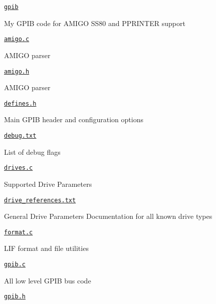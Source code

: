 \begin{DoxyItemize}
\item \href{gpib/gpib}{\tt gpib}
\begin{DoxyItemize}
\item My G\+P\+IB code for A\+M\+I\+GO S\+S80 and P\+P\+R\+I\+N\+T\+ER support
\item \href{gpib/amigo.c}{\tt amigo.\+c}
\begin{DoxyItemize}
\item A\+M\+I\+GO parser
\end{DoxyItemize}
\item \href{gpib/amigo.h}{\tt amigo.\+h}
\begin{DoxyItemize}
\item A\+M\+I\+GO parser
\end{DoxyItemize}
\item \href{gpib/defines.h}{\tt defines.\+h}
\begin{DoxyItemize}
\item Main G\+P\+IB header and configuration options
\end{DoxyItemize}
\item \href{debug.txt}{\tt debug.\+txt}
\begin{DoxyItemize}
\item List of debug flags
\end{DoxyItemize}
\item \href{gpib/drives.c}{\tt drives.\+c}
\begin{DoxyItemize}
\item Supported Drive Parameters
\end{DoxyItemize}
\item \href{gpib/drive_references.txt}{\tt drive\+\_\+references.\+txt}
\begin{DoxyItemize}
\item General Drive Parameters Documentation for all known drive types
\end{DoxyItemize}
\item \href{gpib/format.c}{\tt format.\+c}
\begin{DoxyItemize}
\item L\+IF format and file utilities
\end{DoxyItemize}
\item \href{gpib/gpib.c}{\tt gpib.\+c}
\begin{DoxyItemize}
\item All low level G\+P\+IB bus code
\end{DoxyItemize}
\item \href{gpib/gpib.h}{\tt gpib.\+h}

\end{DoxyItemize}
\end{DoxyItemize}
